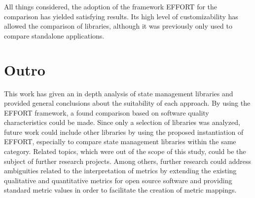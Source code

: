 All things considered, the adoption of the framework EFFORT for the
comparison has yielded satisfying results. Its high level of
customizability has allowed the comparison of libraries, although it was
previously only used to compare standalone applications.

\hypertarget{conclusion-and-future-work}{%
    \chapter{Outro}\label{conclusion-and-future-work}}

This work has given an in depth analysis of state management libraries
and provided general conclusions about the suitability of each approach.
By using the EFFORT framework, a found comparison based on software quality
characteristics could be made. Since only a selection of libraries was analyzed,
future work could include other libraries by using the proposed instantiation of EFFORT,
especially to compare state management libraries within the same category.
Related topics, which were out of the scope of this study, could be the subject
of further research projects. Among others, further research could address
ambiguities related to the interpretation of metrics by extending the existing
qualitative and quantitative metrics for open source software and providing
standard metric values in order to facilitate the creation of metric mappings.
